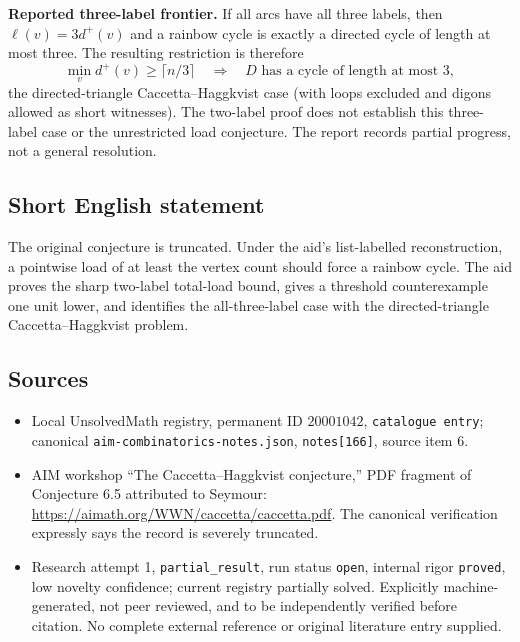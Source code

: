 \documentclass[11pt]{article}
\begin{document}
\textbf{Reported three-label frontier.} If all arcs have all three labels, then $\ell(v)=3d^+(v)$ and a rainbow cycle is exactly a directed cycle of length at most three. The resulting restriction is therefore
\[
 \min_v d^+(v)\geq\lceil n/3\rceil
 \quad\Longrightarrow\quad D\text{ has a cycle of length at most }3,
\]
the directed-triangle Caccetta--Haggkvist case (with loops excluded and digons allowed as short witnesses). The two-label proof does not establish this three-label case or the unrestricted load conjecture. The report records partial progress, not a general resolution.
\subsection{Short English statement}
The original conjecture is truncated. Under the aid's list-labelled reconstruction, a pointwise load of at least the vertex count should force a rainbow cycle. The aid proves the sharp two-label total-load bound, gives a threshold counterexample one unit lower, and identifies the all-three-label case with the directed-triangle Caccetta--Haggkvist problem.
\subsection{Sources}
\begin{itemize}
\item Local UnsolvedMath registry, permanent ID $20001042$, \texttt{catalogue entry}; canonical \texttt{aim-combinatorics-notes.json}, \texttt{notes[166]}, source item 6.
\item AIM workshop ``The Caccetta--Haggkvist conjecture,'' PDF fragment of Conjecture 6.5 attributed to Seymour: \url{https://aimath.org/WWN/caccetta/caccetta.pdf}. The canonical verification expressly says the record is severely truncated.
\item Research attempt 1, \texttt{partial\_result}, run status \texttt{open}, internal rigor \texttt{proved}, low novelty confidence; current registry partially solved. Explicitly machine-generated, not peer reviewed, and to be independently verified before citation. No complete external reference or original literature entry supplied.
\end{itemize}
\end{document}
